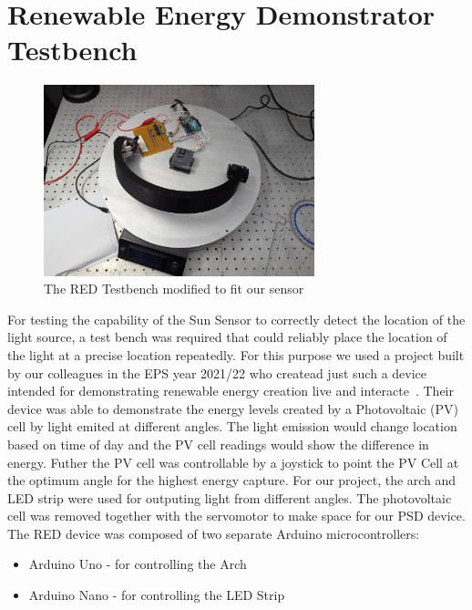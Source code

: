 \section{Renewable Energy Demonstrator Testbench}
\label{REDtestbench}

\begin{figure}[htbp]
    \centering
    \includegraphics[width=0.7\textwidth]{chapters/methodology/RED/RED_image.png}
    \caption{The RED Testbench modified to fit our sensor} 
    \label{fig:RED_testbench_flowchart}
\end{figure}

For testing the capability of the Sun Sensor to correctly detect the location of the light source, a test bench was required that could reliably place the location of the light at a precise location repeatedly. For this purpose we used a project built by our colleagues in the \acf{EPS} year 2021/22 who createad just such a device intended for demonstrating renewable energy creation live and interacte~\cite{RefWorks:shopov2022renewable}. Their device was able to demonstrate the energy levels created by a Photovoltaic (PV) cell by light emited at different angles. The light emission would change location based on time of day and the PV cell readings would show the difference in energy. Futher the PV cell was controllable by a joystick to point the PV Cell at the optimum angle for the highest energy capture. For our project, the arch and LED strip were used for outputing light from different angles. The photovoltaic cell was removed together with the servomotor to make space for our \ac{PSD} device.  The \ac{RED} device was composed of two separate Arduino microcontrollers:
\begin{itemize}
    \item Arduino Uno - for controlling the Arch 
    \item Arduino Nano - for controlling the LED Strip
\end{itemize}

